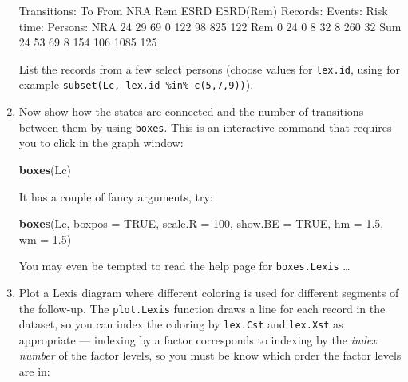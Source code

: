 \documentclass[
]{book}
\newenvironment{Shaded}{\begin{snugshade}}{\end{snugshade}}
\newcommand{\AttributeTok}[1]{\textcolor[rgb]{0.13,0.29,0.53}{#1}}
\newcommand{\ConstantTok}[1]{\textcolor[rgb]{0.56,0.35,0.01}{#1}}
\newcommand{\DecValTok}[1]{\textcolor[rgb]{0.00,0.00,0.81}{#1}}
\newcommand{\FloatTok}[1]{\textcolor[rgb]{0.00,0.00,0.81}{#1}}
\newcommand{\FunctionTok}[1]{\textcolor[rgb]{0.13,0.29,0.53}{\textbf{#1}}}
\newcommand{\NormalTok}[1]{#1}
\begin{document}
\begin{enumerate}
\begin{Shaded}
\begin{Highlighting}[]

\NormalTok{Transitions:}
\NormalTok{     To}
\NormalTok{From  NRA Rem ESRD ESRD(Rem)  Records:  Events: Risk time:  Persons:}
\NormalTok{  NRA  24  29   69         0       122       98        825       122}
\NormalTok{  Rem   0  24    0         8        32        8        260        32}
\NormalTok{  Sum  24  53   69         8       154      106       1085       125}
\end{Highlighting}
\end{Shaded}

  List the records from a few select persons (choose values for
  \texttt{lex.id}, using for example \texttt{subset(Lc,\ lex.id\ \%in\%\ c(5,7,9))}).
\item
  Now show how the states are connected and the number of transitions
  between them by using \texttt{boxes}. This is an interactive command
  that requires you to click in the graph window:

\begin{Shaded}
\begin{Highlighting}[]
\FunctionTok{boxes}\NormalTok{(Lc)}
\end{Highlighting}
\end{Shaded}

  It has a couple of fancy arguments, try:

\begin{Shaded}
\begin{Highlighting}[]
\FunctionTok{boxes}\NormalTok{(Lc, }\AttributeTok{boxpos =} \ConstantTok{TRUE}\NormalTok{, }\AttributeTok{scale.R =} \DecValTok{100}\NormalTok{, }\AttributeTok{show.BE =} \ConstantTok{TRUE}\NormalTok{, }\AttributeTok{hm =} \FloatTok{1.5}\NormalTok{, }\AttributeTok{wm =} \FloatTok{1.5}\NormalTok{)}
\end{Highlighting}
\end{Shaded}

  You may even be tempted to read the help page for
  \texttt{boxes.Lexis} \ldots{}
\item
  Plot a Lexis diagram where different coloring is
  used for different segments of the follow-up. The
  \texttt{plot.Lexis} function draws a line for each record in the
  dataset, so you can index the coloring by \texttt{lex.Cst} and
  \texttt{lex.Xst} as appropriate --- indexing by a factor corresponds
  to indexing by the \emph{index number} of the factor levels, so you
  must be know which order the factor levels are in:


\end{enumerate}
\end{document}

